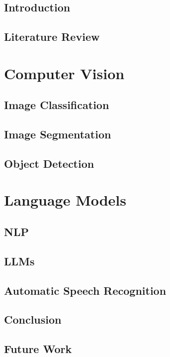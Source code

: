 \documentclass[a4paper,12pt]{report}
\begin{document}

\chapter{Introduction}
\label{chap:introduction}
\chapter{Literature Review}
\label{chap:literature_review}

\part{Computer Vision}


\chapter{Image Classification}
\label{chap:classification}



\chapter{Image Segmentation}
\label{chap:segmentation}


\chapter{Object Detection}
\label{chap:object_detection}


\part{Language Models}


\chapter{NLP}

\label{chap:nlp}


\chapter{LLMs}
\label{chap:llm}



\chapter{Automatic Speech Recognition}
\label{chap:asr}


\chapter{Conclusion}
\label{chap:conclusion}


\chapter{Future Work}
\label{chap:future_work}



\printbibliography[title=References]
\end{document}
